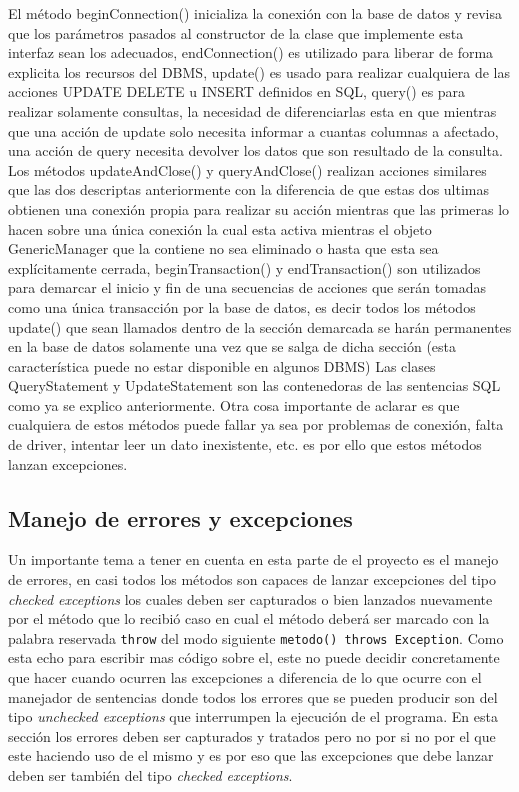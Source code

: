 El método beginConnection() inicializa la conexión con la base de datos y revisa que los parámetros pasados al constructor de la clase que implemente esta interfaz sean los adecuados, endConnection() es utilizado para liberar de forma explicita los recursos del DBMS, update() es usado para realizar cualquiera de las acciones UPDATE DELETE u INSERT definidos en SQL, query() es para realizar solamente consultas, la necesidad de diferenciarlas esta en que mientras que una acción de update solo necesita informar a cuantas columnas a afectado, una acción de query necesita devolver los datos que son resultado de la consulta. Los métodos updateAndClose() y queryAndClose() realizan acciones similares que las dos descriptas anteriormente con la diferencia de que estas dos ultimas obtienen una conexión propia para realizar su acción mientras que las primeras lo hacen sobre una única conexión la cual esta activa mientras el objeto GenericManager que la contiene no sea eliminado o hasta que esta sea explícitamente cerrada, beginTransaction() y endTransaction() son utilizados para demarcar el inicio y fin de una secuencias de acciones que serán tomadas como una única transacción por la base de datos, es decir todos los métodos update() que sean llamados dentro de la sección demarcada se harán permanentes en la base de datos solamente una vez que se salga de dicha sección (esta característica puede no estar disponible en algunos DBMS) Las clases QueryStatement y UpdateStatement son las contenedoras de las sentencias SQL como ya se explico anteriormente. Otra cosa importante de aclarar es que cualquiera de estos métodos puede fallar ya sea por problemas de conexión, falta de driver, intentar leer un dato inexistente, etc. es por ello que estos métodos lanzan excepciones. 
%
\subsection{Manejo de errores y excepciones}
Un importante tema a tener en cuenta en esta parte de el proyecto es el manejo de errores, en \jd casi todos los métodos son capaces de lanzar excepciones del tipo \textit{checked exceptions} los cuales deben ser capturados o bien lanzados nuevamente por el método que lo recibió caso en cual el método deberá ser marcado con la palabra reservada \verb=throw= del modo siguiente \verb=metodo() throws Exception=. Como \jj esta echo para escribir mas código sobre el, este no puede decidir concretamente que hacer cuando ocurren las excepciones a diferencia de lo que ocurre con el manejador de sentencias donde todos los errores que se pueden producir son del tipo \textit{unchecked exceptions} que interrumpen la ejecución de el programa. En esta sección los errores deben ser capturados y tratados pero no por \jj si no por el que este haciendo uso de el mismo y es por eso que las excepciones que debe lanzar \jj deben ser también del tipo \textit{checked exceptions}.

